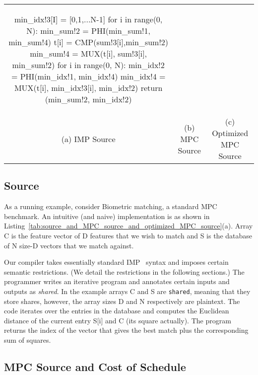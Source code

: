 \begin{table*}
\begin{tabular}{ccc}
\begin{minipage}{0.33\textwidth}
{\begin{pythonn}
min_idx!3[I] = [0,1,...N-1]
for i in range(0, N):
   min_sum!2 = PHI(min_sum!1, min_sum!4)
   t[i] = CMP(sum!3[i],min_sum!2)
   min_sum!4 = MUX(t[i], sum!3[i], min_sum!2)
for i in range(0, N):
   min_idx!2 = PHI(min_idx!1, min_idx!4)
   min_idx!4 = MUX(t[i], min_idx!3[i], min_idx!2)
return (min_sum!2, min_idx!2)
\end{pythonn}
}
\end{minipage}

\\

(a) IMP Source & (b) MPC Source & (c) Optimized MPC Source
\end{tabular}
\caption{Biometric Matching: From IMP Source to MPC Source to Optimized MPC Source. }
\label{tab:source_and_MPC_source_and_optimized_MPC_source}
\end{table*}


\subsection{Source}

As a running example, consider Biometric matching, a standard MPC benchmark.
An intuitive (and naive) implementation is as shown in Listing~\ref{tab:source_and_MPC_source_and_optimized_MPC_source}(a).
Array {\sf C} is the feature vector of {\sf D} features that we wish to match and {\sf S}
is the database of {\sf N} size-{\sf D} vectors that we match against.

Our compiler takes essentially standard IMP~
syntax and imposes certain semantic restrictions. (We detail the restrictions in the following sections.)
The programmer writes an iterative program and annotates certain inputs
and outputs as \emph{shared}. In the example arrays {\sf C} and {\sf S}
are \texttt{shared}, meaning that they store shares, however, the array sizes {\sf D} and
{\sf N} respectively are plaintext. The code iterates over the entries in the
database and computes the Euclidean distance of the current
entry {\sf S[i]} and {\sf C} (its square actually). The program returns the index of the vector that gives
the best match plus the corresponding sum of squares.


\subsection{MPC Source and Cost of Schedule}

